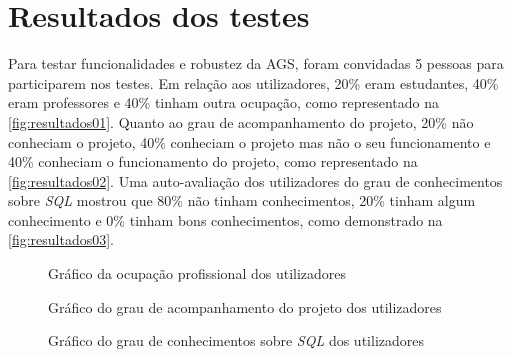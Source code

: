 \documentclass[11pt,twoside,a4paper]{report}
\begin{document}
\section{Resultados dos testes}
Para testar funcionalidades e robustez da AGS, foram convidadas 5 pessoas para participarem nos testes. Em relação aos utilizadores, 20\% eram estudantes, 40\% eram professores e 40\% tinham outra ocupação, como representado na \autoref{fig:resultados01}. Quanto ao grau de acompanhamento do projeto, 20\% não conheciam o projeto, 40\% conheciam o projeto mas não o seu funcionamento e 40\% conheciam o funcionamento do projeto, como representado na \autoref{fig:resultados02}. Uma auto-avaliação dos utilizadores do grau de conhecimentos sobre \textit{SQL} mostrou que 80\% não tinham conhecimentos, 20\% tinham algum conhecimento e 0\% tinham bons conhecimentos, como demonstrado na \autoref{fig:resultados03}.
\begin{figure}[H]
	\centering
	\caption{Gráfico da ocupação profissional dos utilizadores}
	\label{fig:resultados01}
\end{figure}
\begin{figure}[H]
	\centering
	\caption{Gráfico do grau de acompanhamento do projeto dos utilizadores}
	\label{fig:resultados02}
\end{figure}
\begin{figure}[H]
	\centering
	\caption{Gráfico do grau de conhecimentos sobre \textit{SQL} dos utilizadores}
	\label{fig:resultados03}
\end{figure}
\end{document}
